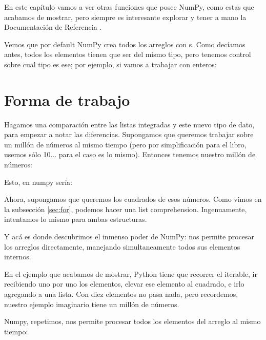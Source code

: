 
En este capítulo vamos a ver otras funciones que posee NumPy, como estas que acabamos de mostrar, pero siempre es interesante explorar y tener a mano la Documentación de Referencia \cite{numpy_referencia}.

Vemos que por default NumPy crea todos los arreglos con s. Como decíamos antes, todos los elementos tienen que ser del mismo tipo, pero tenemos control sobre cual tipo es ese; por ejemplo, si vamos a trabajar con enteros:



\section{Forma de trabajo}

Hagamos una comparación entre las listas integradas y este nuevo tipo de dato, para empezar a notar las diferencias. Supongamos que queremos trabajar sobre un millón de números al mismo tiempo (pero por simplificación para el libro, usemos sólo 10... para el caso es lo mismo). Entonces tenemos nuestro millón de números:


Esto, en numpy sería:


Ahora, supongamos que queremos los cuadrados de esos números. Como vimos en la subsección \ref{sec:for}, podemos hacer una list comprehension. Ingenuamente, intentamos lo mismo para ambas estructuras.


Y acá es donde descubrimos el inmenso poder de NumPy: nos permite procesar los arreglos directamente, manejando simultaneamente todos sus elementos internos.

En el ejemplo que acabamos de mostrar, Python tiene que recorrer el iterable, ir recibiendo uno por uno los elementos, elevar ese elemento al cuadrado, e irlo agregando a una lista. Con diez elementos no pasa nada, pero recordemos, nuestro ejemplo imaginario tiene un millón de números.

Numpy, repetimos, nos permite procesar todos los elementos del arreglo al mismo tiempo:


